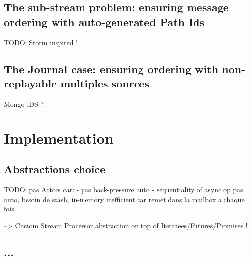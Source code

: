 \subsection{The sub-stream problem: ensuring message ordering with auto-generated Path Ids}


TODO: Storm inspired !


\subsection{The Journal case: ensuring ordering with non-replayable multiples sources}

Mongo IDS ?

\section{Implementation}

\subsection{Abstractions choice}

TODO: pas Actors car:
- pas back-pressure auto
- sequentiality of async op pas auto, besoin de stash, in-memory inefficient car remet dans la mailbox a chaque fois...

--> Custom Stream Processor abstraction on top of Iteratees/Futures/Promises !

\subsection{...}



